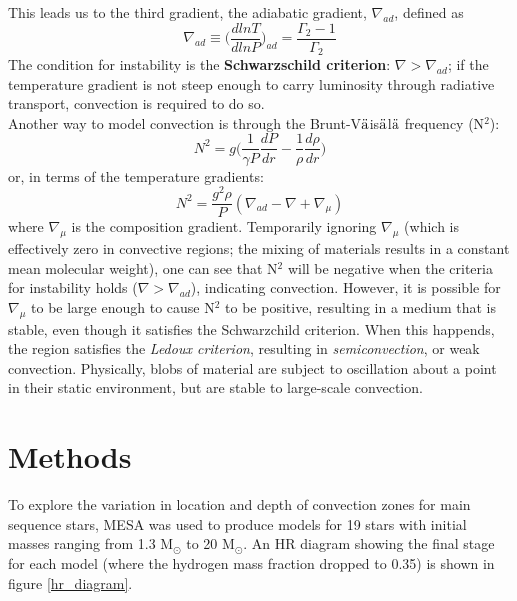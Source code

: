 \documentclass[12pt]{article}
\begin{document}
\noindent
This leads us to the third gradient, the adiabatic gradient,
$\nabla_{ad}$, defined as
\begin{equation}
    \nabla_{ad} \equiv \Big(\frac{dlnT}{dlnP}\Big)_{ad}
    = \frac{\Gamma_2-1}{\Gamma_2}
\end{equation}
The condition for instability is the
\textbf{Schwarzschild criterion}: $\nabla > \nabla_{ad}$;
if the temperature gradient is not steep enough to carry luminosity
through radiative transport, convection is required to do so.\\

\noindent
Another way to model convection is through the
Brunt-V$\ddot{\rm a}$is$\ddot{\rm a}$l$\ddot{\rm a}$
frequency (N$^2$):
\begin{equation}
    N^2 = g\Big(\frac{1}{\gamma P}\frac{dP}{dr} -
    \frac{1}{\rho}\frac{d\rho}{dr}\Big)
\end{equation}
or, in terms of the temperature gradients:
\begin{equation}
    N^2 = \frac{g^2\rho}{P}(\nabla_{ad} - \nabla + \nabla_{\mu})
\end{equation}
where $\nabla_{\mu}$ is the composition gradient.
Temporarily ignoring $\nabla_{\mu}$ (which is effectively zero in
convective regions; the mixing of materials results in a constant mean
molecular weight), one can see that N$^2$ will be
negative when the criteria for instability holds ($\nabla >
\nabla_{ad}$), indicating convection.
However, it is possible for $\nabla_{\mu}$ to be large enough
to cause N$^2$ to be positive, resulting in a medium that is stable,
even though it satisfies the Schwarzchild criterion.
When this happends, the region satisfies the
\textit{Ledoux criterion}, resulting in \textit{semiconvection}, or
weak convection. Physically, blobs of material
are subject to oscillation about a point in their static environment,
but are stable to large-scale convection.

\section{Methods}
To explore the variation in location and depth of convection zones for
main sequence stars, MESA was used to produce models for 19 stars
 with initial masses ranging
from 1.3 M$_\odot$ to 20 M$_\odot$.
An HR diagram showing the final stage for each model (where the hydrogen
mass fraction dropped to 0.35) is shown in figure \ref{hr_diagram}.\\
\end{document}
